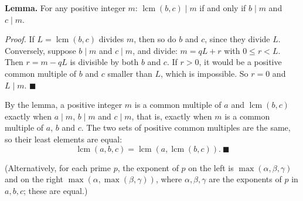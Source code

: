 \textbf{Lemma.} For any positive integer $m$: $\operatorname{lcm}(b,c)\mid m$ if and only if $b\mid m$ and $c\mid m$.

\emph{Proof.} If $L=\operatorname{lcm}(b,c)$ divides $m$, then so do $b$ and $c$, since they divide $L$. Conversely, suppose $b\mid m$ and $c\mid m$, and divide: $m=qL+r$ with $0\le r<L$. Then $r=m-qL$ is divisible by both $b$ and $c$. If $r>0$, it would be a positive common multiple of $b$ and $c$ smaller than $L$, which is impossible. So $r=0$ and $L\mid m$. $\blacksquare$

By the lemma, a positive integer $m$ is a common multiple of $a$ and $\operatorname{lcm}(b,c)$ exactly when $a\mid m$, $b\mid m$ and $c\mid m$, that is, exactly when $m$ is a common multiple of $a$, $b$ and $c$. The two sets of positive common multiples are the same, so their least elements are equal:
\[\operatorname{lcm}(a,b,c)=\operatorname{lcm}\left(a,\operatorname{lcm}(b,c)\right).\ \blacksquare\]

(Alternatively, for each prime $p$, the exponent of $p$ on the left is $\max(\alpha,\beta,\gamma)$ and on the right $\max\left(\alpha,\max(\beta,\gamma)\right)$, where $\alpha,\beta,\gamma$ are the exponents of $p$ in $a,b,c$; these are equal.)
